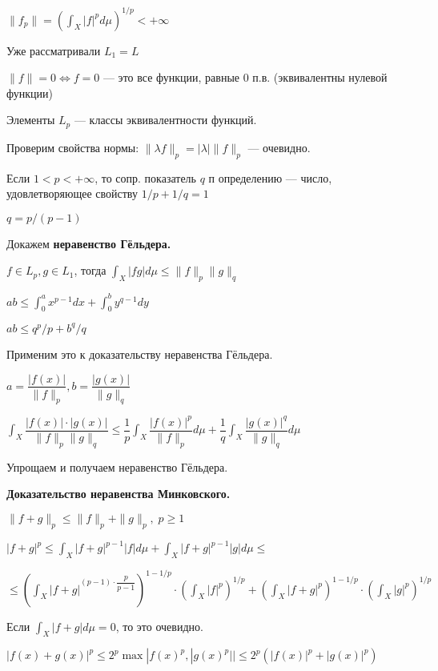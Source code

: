 $\| f_p\| = (\int_X |f|^p d\mu)^{1/p} < + \infty$

Уже рассматривали  $L_1 = L$

$\| f\| = 0 \Leftrightarrow f = 0$ --- это все функции, равные 0
п.в. (эквивалентны нулевой функции)

Элементы $L_p$ --- классы эквивалентности функций.

Проверим свойства нормы: $\|\lambda f\|_p = |\lambda| \|f\|_p$ ---
очевидно.

Если $1 < p < + \infty$, то сопр. показатель $q$ п определению ---
число, удовлетворяющее свойству $1/p + 1/q = 1$

%
%
%
%
%
%
%
%
%
%
%

$q = p/(p-1)$

Докажем \textbf{неравенство Гёльдера.}

$f \in L_p, g \in L_1$, тогда $\int_X |fg| d \mu \leqslant \|f\|_p
\|g\|_q$

$ab \leqslant \int_0^a x^{p-1}dx + \int_0^b y^{q-1}dy $

$ab \leqslant q^p/p + b^q/q$

Применим это к доказательству неравенства Гёльдера.

$a = \dfrac{|f(x)|}{\|f\|_p}, b = \dfrac{|g(x)|}{\|g\|_q}$

$\int_X \dfrac{|f(x)| \cdot |g(x)|}{\|f\|_p \|g\|_q} \leqslant
\dfrac{1}{p} \int_X \dfrac{|f(x)|^p}{\|f\|_p}d \mu +
\dfrac{1}{q}\int_X \dfrac{|g(x)|^q}{\|g\|_q}d \mu $

Упрощаем и получаем неравенство Гёльдера.


\textbf{Доказательство неравенства Минковского.} \quad

$\|f + g\|_p \leqslant \|f\|_p + \|g\|_p, \; p \geqslant 1$


$|f + g|^p \leqslant \int_X |f + g|^{p-1}|f|d \mu + \int_X |f +
g|^{p-1}|g| d \mu \leqslant $

$\leqslant (\int_X |f + g|^{(p-1)\cdot \dfrac{p}{p-1}})^{1 -
1/p}\cdot(\int_X |f|^p)^{1/p} + (\int_X
|f+g|^p)^{1-1/p}\cdot(\int_X |g|^p)^{1/p}$

Если $\int_X |f + g| d \mu = 0$, то это очевидно.

$|f(x) + g(x)|^p \leqslant 2^p \max{|f(x)^p, |g(x)^p||} \leqslant
2^p(|f(x)|^p + |g(x)|^p)$

